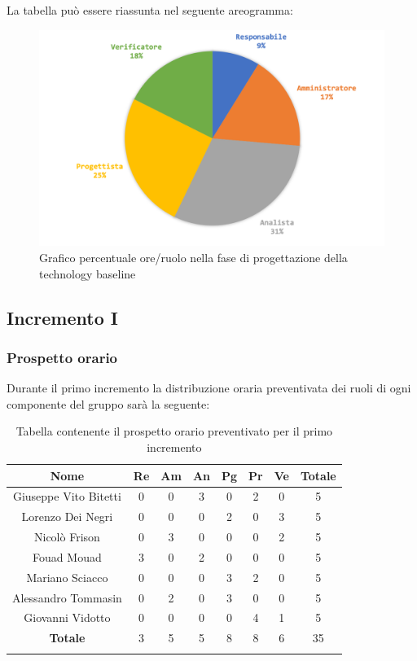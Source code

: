 		La tabella può essere riassunta nel seguente areogramma:
		\begin{figure}[H]
			\centering
			\includegraphics[width=0.8\linewidth]{./images/preventivo/progArch2.png}
			\caption{Grafico percentuale ore/ruolo nella fase di progettazione della technology baseline}
			\label{fig:grafico costi ruolo fase progettazione della technology baseline}
		\end{figure}
	
	
	\subsection{Incremento I}
		\subsubsection{Prospetto orario}
		Durante il primo incremento la distribuzione oraria preventivata dei ruoli di ogni componente del gruppo sarà la seguente:
		
		\begin{longtable}{|c|c|c|c|c|c|c|c|}
			\hline
			\rowcolor{lighter-grayer}
			\textbf{Nome} & \textbf{Re} & \textbf{Am} & \textbf{An} & \textbf{Pg}  & \textbf{Pr}   & \textbf{Ve} & \textbf{Totale} \\
			\hline
			\endfirsthead
			
			\hline
			Giuseppe Vito Bitetti 		 & 0 & 0 & 3 & 0 & 2 & 0 & 5\\
			\hline
			\hline
			Lorenzo Dei Negri			 & 0 & 0 & 0 & 2 & 0 & 3 & 5\\
			\hline
			\hline
			Nicolò Frison				    & 0 & 3 & 0 & 0 & 0 & 2 & 5\\
			\hline
			\hline
			Fouad Mouad 				 & 3 & 0 & 2 & 0 & 0 & 0 & 5\\
			\hline
			\hline
			Mariano Sciacco 			 & 0 & 0 & 0 & 3 & 2 & 0 & 5\\
			\hline
			\hline
			Alessandro Tommasin     & 0 & 2 & 0 & 3 & 0 & 0 & 5\\
			\hline
			\hline
			Giovanni Vidotto 			 & 0 & 0 & 0 & 0 & 4 & 1 & 5\\
			\hline 
			\textbf{Totale}			 		& 3 & 5 & 5 & 8 & 8 & 6 & 35\\
			\hline
			\caption{Tabella contenente il prospetto orario preventivato per il primo incremento}
		\end{longtable}
		\pagebreak
		

